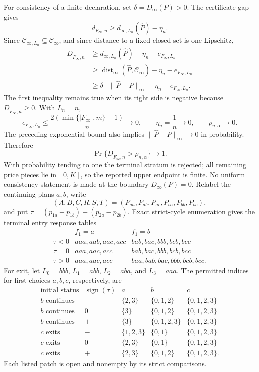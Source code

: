 For consistency of a finite declaration, set \(\delta=D_\infty(P)>0\).  The certificate gap gives
\[
 d^-_{F_\infty,n}
 \ge d_{\infty,L_n}(\widehat P)-\eta_n.
\]
Since \(\mathcal C_{\infty,L_n}\subseteq\mathcal C_\infty\), and since distance to a fixed closed set is one-Lipschitz,
\[
 \begin{aligned}
 \underline D_{F_\infty,n}
 &\ge d_{\infty,L_n}(\widehat P)-\eta_n-e_{F_\infty,L_n}\\
 &\ge\operatorname{dist}_\infty(\widehat P,\mathcal C_\infty)
       -\eta_n-e_{F_\infty,L_n}\\
 &\ge\delta-\|\widehat P-P\|_\infty
       -\eta_n-e_{F_\infty,L_n}.
 \end{aligned}
\]
The first inequality remains true when its right side is negative because \(\underline D_{F_\infty,n}\ge0\).  With \(L_n=n\),
\[
 e_{F_\infty,L_n}
 \le\frac{2(\min\{|F_\infty|,m\}-1)}{n}\longrightarrow0,
 \qquad
 \eta_n=\frac1n\longrightarrow0,
 \qquad
 \rho_{n,\alpha}\longrightarrow0.
\]
The preceding exponential bound also implies \(\|\widehat P-P\|_\infty\to0\) in probability.  Therefore
\[
 \Pr\{\underline D_{F_\infty,n}>\rho_{n,\alpha}\}\longrightarrow1.
\]
With probability tending to one the terminal stratum is rejected; all remaining price pieces lie in \([0,K]\), so the reported upper endpoint is finite.  No uniform consistency statement is made at the boundary \(D_\infty(P)=0\).
Relabel the continuing plans \(a,b\), write
\[
 (A,B,C,R,S,T)=(P_{aa},P_{ab},P_{ac},P_{ba},P_{bb},P_{bc}),
\]
and put \(\tau=(p_{1a}-p_{1b})-(p_{2a}-p_{2b})\).  Exact strict-cycle enumeration gives the terminal entry response tables
\[
\begin{array}{c|c|c}
&f_1=a&f_1=b\\ \hline
\tau<0&aaa,aab,aac,acc&bab,bac,bbb,bcb,bcc\\
\tau=0&aaa,aac,acc&bab,bac,bbb,bcb,bcc\\
\tau>0&aaa,aac,acc&baa,bab,bac,bbb,bcb,bcc.
\end{array}
\]
For exit, let \(L_0=bbb\), \(L_1=abb\), \(L_2=aba\), and \(L_3=aaa\).  The permitted indices for first choices \(a,b,c\), respectively, are
\[
\begin{array}{c|c|c|c|c}
\text{initial status}&\operatorname{sign}(\tau)&a&b&c\\ \hline
b\text{ continues}&-&\{2,3\}&\{0,1,2\}&\{0,1,2,3\}\\
b\text{ continues}&0&\{3\}&\{0,1,2\}&\{0,1,2,3\}\\
b\text{ continues}&+&\{3\}&\{0,1,2,3\}&\{0,1,2,3\}\\
c\text{ exits}&-&\{1,2,3\}&\{0,1\}&\{0,1,2,3\}\\
c\text{ exits}&0&\{2,3\}&\{0,1\}&\{0,1,2,3\}\\
c\text{ exits}&+&\{2,3\}&\{0,1,2\}&\{0,1,2,3\}.
\end{array}
\]
Each listed patch is open and nonempty by its strict comparisons.

